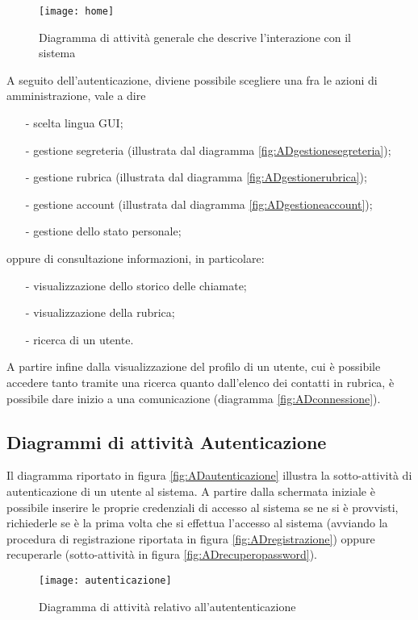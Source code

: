 \begin{figure}[H]
\centering
\texttt{[image: home]}
\caption{Diagramma di attività generale che descrive l'interazione con il sistema}\label{fig:ADhome}
\end{figure}

A seguito dell'autenticazione, diviene possibile scegliere una fra le azioni di amministrazione, vale a dire
\begin{itemize}[noitemsep,nolistsep]
  \item[-] scelta lingua GUI;
  \item[-] gestione segreteria (illustrata dal diagramma \ref{fig:ADgestionesegreteria});
  \item[-] gestione rubrica (illustrata dal diagramma \ref{fig:ADgestionerubrica});
  \item[-] gestione account (illustrata dal diagramma \ref{fig:ADgestioneaccount});
  \item[-] gestione dello stato personale;
\end{itemize}
oppure di consultazione informazioni, in particolare:
\begin{itemize}[noitemsep,nolistsep]
  \item[-] visualizzazione dello storico delle chiamate;
  \item[-] visualizzazione della rubrica;
  \item[-] ricerca di un utente.
\end{itemize}

A partire infine dalla visualizzazione del profilo di un utente, cui è possibile accedere tanto tramite una ricerca quanto dall'elenco dei contatti in rubrica, è possibile dare inizio a una comunicazione (diagramma \vref{fig:ADconnessione}).

\subsection{Diagrammi di attività Autenticazione}
Il diagramma riportato in figura \vref{fig:ADautenticazione} illustra la sotto-attività di autenticazione di un utente al sistema. A partire dalla schermata iniziale è possibile inserire le proprie credenziali di accesso al sistema se ne si è provvisti, richiederle se è la prima volta che si effettua l'accesso al sistema (avviando la procedura di registrazione riportata in figura \ref{fig:ADregistrazione}) oppure recuperarle (sotto-attività in figura \vref{fig:ADrecuperopassword}).

\begin{figure}[H]
\centering
\texttt{[image: autenticazione]}
\caption{Diagramma di attività relativo all'autententicazione}\label{fig:ADautenticazione}
\end{figure}

